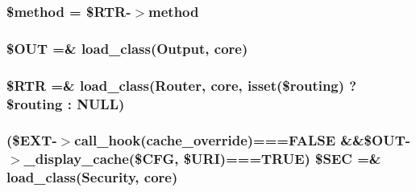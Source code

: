 \subsubsection[{\$method}]{\setlength{\rightskip}{0pt plus 5cm}\$method = \$R\+T\+R-\/$>$method}\label{system_2core_2_code_igniter_8php_a12661b2fc0f57f97e30a1620889ce9c6}
\hypertarget{system_2core_2_code_igniter_8php_ad437402616c81c82c746f09854b23729}{}
\subsubsection[{\$\+O\+U\+T}]{\setlength{\rightskip}{0pt plus 5cm}\$O\+U\+T =\& load\+\_\+class(\textquotesingle{}Output\textquotesingle{}, \textquotesingle{}core\textquotesingle{})}\label{system_2core_2_code_igniter_8php_ad437402616c81c82c746f09854b23729}
\hypertarget{system_2core_2_code_igniter_8php_a4d6c9285c8483e4708a57a4128fc95f3}{}
\subsubsection[{\$\+R\+T\+R}]{\setlength{\rightskip}{0pt plus 5cm}\$R\+T\+R =\& load\+\_\+class(\textquotesingle{}Router\textquotesingle{}, \textquotesingle{}core\textquotesingle{}, isset(\$routing) ? \$routing \+: N\+U\+L\+L)}\label{system_2core_2_code_igniter_8php_a4d6c9285c8483e4708a57a4128fc95f3}
\hypertarget{system_2core_2_code_igniter_8php_af78ce53fb82103e1165678dd2d3385a4}{}
\subsubsection[{\$\+S\+E\+C}]{ (\$E\+X\+T-\/$>$call\+\_\+hook(\textquotesingle{}cache\+\_\+override\textquotesingle{})===F\+A\+L\+S\+E \&\&\$O\+U\+T-\/$>$\+\_\+display\+\_\+cache(\$C\+F\+G, \$U\+R\+I)===T\+R\+U\+E) \$S\+E\+C =\& load\+\_\+class(\textquotesingle{}Security\textquotesingle{}, \textquotesingle{}core\textquotesingle{})}\label{system_2core_2_code_igniter_8php_af78ce53fb82103e1165678dd2d3385a4}
\hypertarget{system_2core_2_code_igniter_8php_a2060dabd8d00b5b0539bd041bf450924}{}
